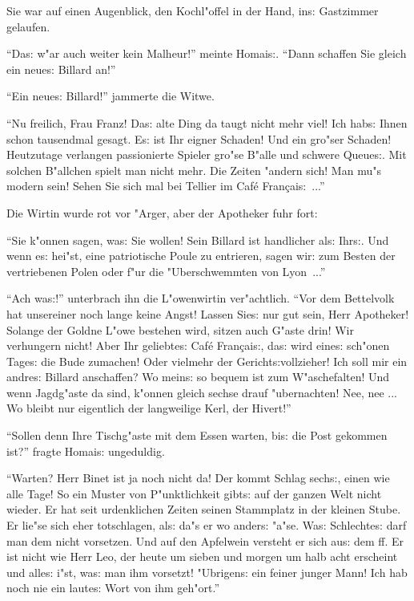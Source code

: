 \documentclass[oneside,12pt]{book}
\newcommand{\s}{s:}%
\begin{document}
Sie war auf einen Augenblick, den Kochl"offel in der Hand, in{\s}
Gast\/zimmer gelaufen.

"`Da{\s} w"ar auch weiter kein Malheur!"' meinte Homai{\s}. "`Dann
schaffen Sie gleich ein neue{\s} Billard an!"'

"`Ein neue{\s} Billard!"' jammerte die Witwe.

"`Nu freilich, Frau Franz! Da{\s} alte Ding da taugt nicht mehr
viel! Ich hab{\s} Ihnen schon tausendmal gesagt. E{\s} ist Ihr
eigner Schaden! Und ein gro"ser Schaden! Heutzutage verlangen
passionierte Spieler gro"se B"alle und schwere Queue{\s}. Mit
solchen B"allchen spielt man nicht mehr. Die Zeiten "andern sich!
Man mu"s modern sein! Sehen Sie sich mal bei Tellier im Caf\'e
Fran\c{c}ai{\s}~..."'

Die Wirtin wurde rot vor "Arger, aber der Apotheker fuhr fort:

"`Sie k"onnen sagen, wa{\s} Sie wollen! Sein Billard ist
handlicher al{\s} Ihr{\s}. Und wenn e{\s} hei"st, eine
patriotische Poule zu entrieren, sagen wir: zum Besten der
vertriebenen Polen oder f"ur die "Uberschwemmten von Lyon~..."'

"`Ach wa{\s}!"' unterbrach ihn die L"owenwirtin ver"achtlich.
"`Vor dem Bettelvolk hat unsereiner noch lange keine Angst! Lassen
Sie{\s} nur gut sein, Herr Apotheker! Solange der Goldne L"owe
bestehen wird, sitzen auch G"aste drin! Wir verhungern nicht! Aber
Ihr geliebte{\s} Caf\'e Fran\c{c}ai{\s}, da{\s} wird eine{\s}
sch"onen Tage{\s} die Bude zumachen! Oder vielmehr der
Gericht{\s}vollzieher! Ich soll mir ein andre{\s} Billard
anschaffen? Wo mein{\s} so bequem ist zum W"aschefalten! Und wenn
Jagdg"aste da sind, k"onnen gleich sechse drauf "ubernachten! Nee,
nee ... Wo bleibt nur eigentlich der langweilige Kerl, der
Hivert!"'

"`Sollen denn Ihre Tischg"aste mit dem Essen warten, bi{\s} die
Post gekommen ist?"' fragte Homai{\s} ungeduldig.

"`Warten? Herr Binet ist ja noch nicht da! Der kommt Schlag
sech{\s}, einen wie alle Tage! So ein Muster von P"unktlichkeit
gibt{\s} auf der ganzen Welt nicht wieder. Er hat seit
urdenklichen Zeiten seinen Stammplatz in der kleinen Stube. Er
lie"se sich eher totschlagen, al{\s} da"s er wo ander{\s} "a"se.
Wa{\s} Schlechte{\s} darf man dem nicht vorsetzen. Und auf den
Apfelwein versteht er sich au{\s} dem ff. Er ist nicht wie Herr
Leo, der heute um sieben und morgen um halb acht erscheint und
alle{\s} i"st, wa{\s} man ihm vorsetzt! "Ubrigen{\s} ein feiner
junger Mann! Ich hab noch nie ein laute{\s} Wort von ihm
geh"ort."'
\end{document}
